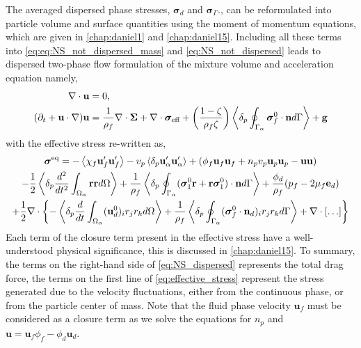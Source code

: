 The averaged dispersed phase stresses, $\bm\sigma_d$ and $\bm\sigma_\Gamma.$, can be reformulated into particle volume and surface quantities using the moment of momentum equations, which are given in \ref{chap:daniel1} and \ref{chap:daniel15}. 
Including all these terms into \ref{eq:eq:NS_not_dispersed_mass} and \ref{eq:NS_not_dispersed} leads to dispersed two-phase flow formulation of the mixture volume and acceleration equation namely, 
\begin{align}
    \div\textbf{u}&=0, \\
    (\pddt 
    + \textbf{u}\cdot \grad)
    \textbf{u}
    &= 
    \frac{1}{\rho_f}\div \bm\Sigma
    + \div \bm{\sigma}_\text{eff} 
    + \left(\frac{1-\zeta}{\rho_f\zeta}\right) \pSavg{ \bm{\sigma}_f^0 \cdot \textbf{n}} 
    + \textbf{g} 
    \label{eq:NS_dispersed}
\end{align}
with the effective stress re-written as, 
\begin{multline}
    \bm\sigma^\text{eq} = 
    - \avg{ \chi_f \textbf{u}_f'\textbf{u}_f'}
    - v_p \pavg{ \textbf{u}_\alpha'\textbf{u}_\alpha'}
    + (\phi_f \textbf{u}_f \textbf{u}_f
        +n_pv_p\textbf{u}_p \textbf{u}_p
        - \textbf{uu} 
    )\\
    -\frac{1}{2}\pavg{\frac{d^2 }{dt^2}\intO{\textbf{rr}}}
    +\frac{1}{\rho_f}\pSavg{ 
        (\bm{\sigma}_1^0 \textbf{r}
        + \textbf{r}\bm{\sigma}_1^0 )
        \cdot \textbf{n}
    }
    + \frac{\phi_d}{\rho_f} (p_f -2\mu_f \textbf{e}_d)
    \\
    +\frac{1}{2}\div\left\{
    - \pavg{\ddt\intO{  (\textbf{u}_d^0)_i r_j r_k }}
    +\frac{1}{\rho_f}\pSavg{  (\bm{\sigma}_f^0 \cdot \textbf{n}_d)_i r_{j}  r_{k}  } 
    + \div[\ldots]
    \right\}
    \label{eq:effective_stress}
\end{multline}
Each term of the closure term present in the effective stress have a well-understood physical significance, this is discussed in \ref{chap:daniel15}.
To summary, the terms on the right-hand side of \ref{eq:NS_dispersed} represents the total drag force, the terms on the first line of \ref{eq:effective_stress} represent the stress generated due to the velocity fluctuations, either from the continuous phase, or from the particle center of mass. 
Note that the fluid phase velocity $\textbf{u}_f$ must be considered as a closure term as we solve the equations for $n_p$ and  $\textbf{u} = \textbf{u}_f \phi_f - \phi_d \textbf{u}_d$.
